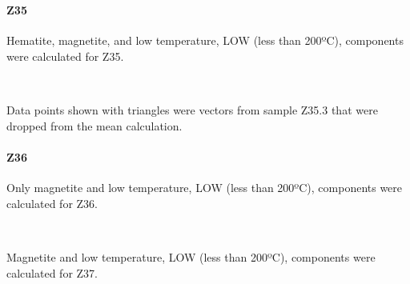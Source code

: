 \documentclass[11pt]{article}
\begin{document}
    \begin{center}
    \end{center}
    { \hspace*{\fill} \\}
    
    \paragraph{Z35}\label{z35}

    Hematite, magnetite, and low temperature, LOW (less than 200ºC),
components were calculated for Z35.



    \begin{center}
    \end{center}
    { \hspace*{\fill} \\}
    
    Data points shown with triangles were vectors from sample Z35.3 that
were dropped from the mean calculation.

    \paragraph{Z36}\label{z36}

    Only magnetite and low temperature, LOW (less than 200ºC), components
were calculated for Z36.



    \begin{center}
    \end{center}
    { \hspace*{\fill} \\}
    
    Magnetite and low temperature, LOW (less than 200ºC), components were
calculated for Z37.



    \begin{center}
    \end{center}
    { \hspace*{\fill} \\}
    
\end{document}

